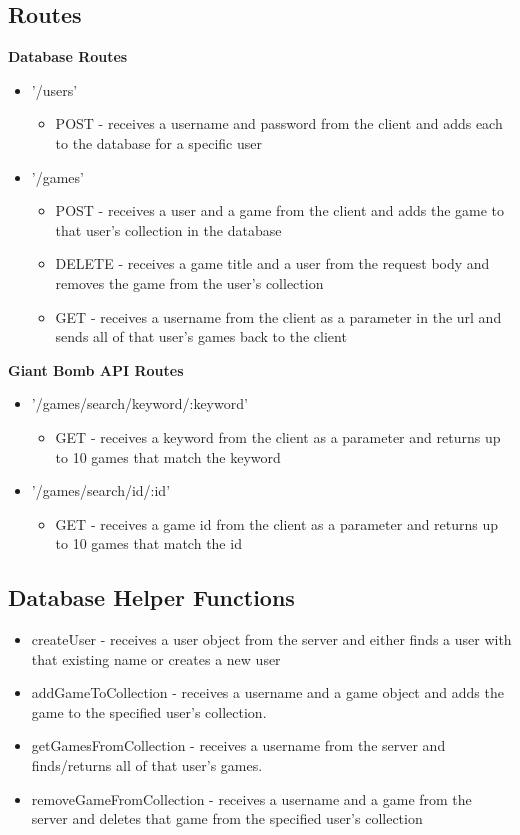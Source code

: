 \documentclass{article}
\begin{document}
\subsection{Routes}
\textbf{Database Routes}
\begin{itemize}
  \item '/users'
  \begin{itemize}
    \item POST - receives a username and password from the client and adds each to the database for a specific user
  \end{itemize}
  \item '/games'
  \begin{itemize}
    \item POST - receives a user and a game from the client and adds the game to that user's collection in the database
    \item DELETE - receives a game title and a user from the request body and removes the game from the user’s collection
    \item GET - receives a username from the client as a parameter in the url and sends all of that user’s games back to the client
  \end{itemize}
\end{itemize}
\textbf{Giant Bomb API Routes}
\begin{itemize}
  \item '/games/search/keyword/:keyword'
  \begin{itemize}
    \item GET - receives a keyword from the client as a parameter and returns up to 10 games that match the keyword
  \end{itemize}
  \item '/games/search/id/:id'
  \begin{itemize}
    \item GET - receives a game id from the client as a parameter and returns up to 10 games that match the id
  \end{itemize}
\end{itemize}

\subsection{Database Helper Functions}
\begin{itemize}
  \item createUser - receives a user object from the server and either finds a user with that existing name or creates a new user
  \item addGameToCollection - receives a username and a game object and adds the game to the specified user’s collection.
  \item getGamesFromCollection - receives a username from the server and finds/returns all of that user’s games.
  \item removeGameFromCollection - receives a username and a game from the server and deletes that game from the specified user’s collection
\end{itemize}
\end{document}
